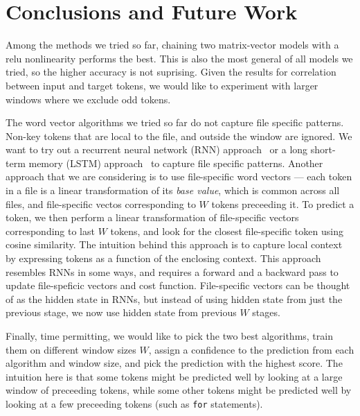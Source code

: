 \vspace{-10pt}
\section{Conclusions and Future Work}
\label{sec:conclusions}

\noindent
Among the methods we tried so far, chaining two matrix-vector models with a
relu nonlinearity performs the best.
This is also the most general of all models we tried, so
the higher accuracy is not suprising. Given the results for correlation between
input and target tokens, we would like to experiment with larger windows
where we exclude odd tokens.

The word vector algorithms we tried so far do not capture file specific
patterns. Non-key tokens that are local to the file, and outside the window are
ignored. We want to try out a recurrent neural network (RNN)
approach~\cite{rnn} or a long short-term memory (LSTM) approach~\cite{lstm,
rnnlstm} to
capture file specific patterns. Another approach that we are considering is to
use file-specific word vectors --- each token in a file is a linear
transformation of its \emph{base value}, which is common across all files, and
file-specific vectos corresponding to $W$ tokens preceeding it.
To predict a token, we then perform a linear transformation of file-specific
vectors corresponding to last $W$ tokens, and look for the closest
file-specific token using cosine similarity. The intuition behind this approach
is to capture local context by expressing tokens as a function of the enclosing
context. This approach resembles RNNs in some ways, and requires a forward and
a backward pass to update file-speficic vectors and cost function.
File-specific vectors can be thought of as the hidden state in RNNs, but
instead of using hidden state from just the previous stage, we now use
hidden state from previous $W$ stages.

Finally, time permitting,
we would like to pick the two best algorithms, train them on different
window sizes $W$, assign a confidence to the prediction from each algorithm and
window size, and pick the prediction with the highest score.
The intuition here is that some tokens might be predicted well by
looking at a large window of preceeding tokens, while some other tokens might
be predicted well by looking at a few preceeding tokens (such as {\tt for}
statements).
